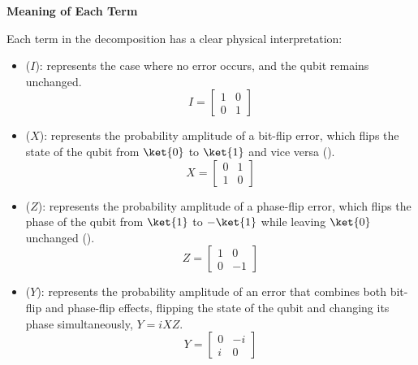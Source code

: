 \begin{flushleft}
    \textcolor{Green3}{ \textbf{Meaning of Each Term}}
\end{flushleft}
Each term in the decomposition has a clear physical interpretation:
\begin{itemize}
    \item {} ($I$): represents the case where no error occurs, and the qubit remains unchanged.
    \begin{equation*}
        I = \begin{bmatrix}
            1 & 0 \\
            0 & 1
        \end{bmatrix}
    \end{equation*}

    \item {} ($X$): represents the probability amplitude of a bit-flip error, which flips the state of the qubit from $\ket{0}$ to $\ket{1}$ and vice versa ().
    \begin{equation*}
        X = \begin{bmatrix}
            0 & 1 \\
            1 & 0
        \end{bmatrix}
    \end{equation*}

    \item {} ($Z$): represents the probability amplitude of a phase-flip error, which flips the phase of the qubit from $\ket{1}$ to $-\ket{1}$ while leaving $\ket{0}$ unchanged ().
    \begin{equation*}
        Z = \begin{bmatrix}
            1 & 0 \\
            0 & -1
        \end{bmatrix}
    \end{equation*}

    \item {} ($Y$): represents the probability amplitude of an error that combines both bit-flip and phase-flip effects, flipping the state of the qubit and changing its phase simultaneously, $Y = iXZ$.
    \begin{equation*}
        Y = \begin{bmatrix}
            0 & -i \\
            i & 0
        \end{bmatrix}
    \end{equation*}
\end{itemize}

